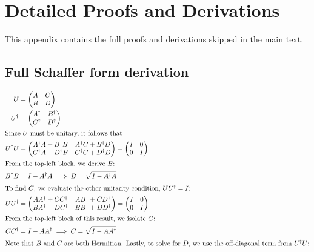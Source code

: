 \chapter{Detailed Proofs and Derivations}
This appendix contains the full proofs and derivations skipped in the main text.

\section{Full Schaffer form derivation}
\label{app:Schaffer}
\begin{align*}
    U &= \begin{pmatrix} A & C \\ B & D \end{pmatrix} \\
    U^\dagger &= \begin{pmatrix} A^\dagger & B^\dagger \\ C^\dagger & D^\dagger \end{pmatrix} \\
    \intertext{Since $U$ must be unitary, it follows that}
    U^\dagger U &= \begin{pmatrix} A^\dagger A + B^\dagger B & A^\dagger C + B^\dagger D \\ 
    C^\dagger A + D^\dagger B & C^\dagger C + D^\dagger D \end{pmatrix} = \begin{pmatrix} I & 0 \\ 0 & I \end{pmatrix} \\
    \intertext{From the top-left block, we derive $B$:}
    B^\dagger B &= I - A^\dagger A \implies B = \sqrt{I - A^\dagger A} \\
    \intertext{To find $C$, we evaluate the other unitarity condition, $U U^\dagger = I$:}
    U U^\dagger &= \begin{pmatrix} A A^\dagger + C C^\dagger & A B^\dagger + C D^\dagger \\ 
    B A^\dagger + D C^\dagger & B B^\dagger + D D^\dagger \end{pmatrix} = \begin{pmatrix} I & 0 \\ 0 & I \end{pmatrix} \\
    \intertext{From the top-left block of this result, we isolate $C$:}
    C C^\dagger &= I - A A^\dagger \implies C = \sqrt{I - A A^\dagger} \\
    \intertext{Note that $B$ and $C$ are both Hermitian. Lastly, to solve for $D$, we use the off-diagonal term from $U^\dagger U$:}

\end{align*}
